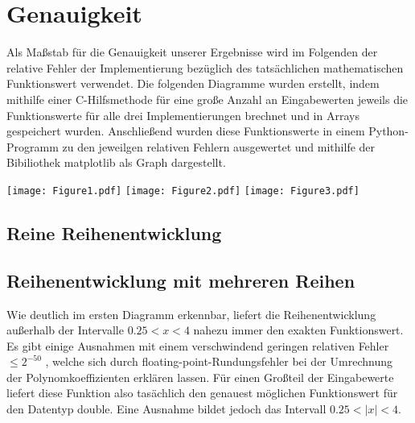 \documentclass[course=erap] {aspdoc}
\begin{document}
 
     \section{Genauigkeit}
     Als Maßstab für die Genauigkeit unserer Ergebnisse wird im Folgenden der relative Fehler der Implementierung bezüglich des tatsächlichen mathematischen Funktionswert verwendet. Die folgenden Diagramme wurden erstellt, indem mithilfe einer C-Hilfsmethode für eine große Anzahl an Eingabewerten jeweils die Funktionswerte für alle drei Implementierungen brechnet und in Arrays gespeichert wurden. Anschließend wurden diese Funktionswerte in einem Python-Programm zu den jeweilgen relativen Fehlern ausgewertet und mithilfe der Bibiliothek matplotlib als Graph dargestellt.
 
     \texttt{[image: Figure1.pdf]}
     \texttt{[image: Figure2.pdf]}
     \texttt{[image: Figure3.pdf]}

     
     \subsection{Reine Reihenentwicklung}
     
 
 
     
     \subsection{Reihenentwicklung mit mehreren Reihen}
     Wie deutlich im ersten Diagramm erkennbar, liefert die Reihenentwicklung außerhalb der Intervalle $0.25<x<4$ nahezu immer den exakten Funktionswert. Es gibt einige Ausnahmen mit einem verschwindend geringen relativen Fehler $\leq2^{-50}$ , welche sich durch floating-point-Rundungsfehler bei der Umrechnung der Polynomkoeffizienten erklären lassen.
     Für einen Großteil der Eingabewerte liefert diese Funktion also tasächlich den genauest möglichen Funktionswert für den Datentyp double. Eine Ausnahme bildet jedoch das Intervall $0.25<|x|<4$. 
     
\end{document}
